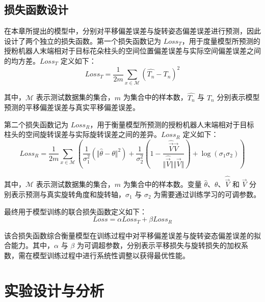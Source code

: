 \subsection{损失函数设计}
在本章所提出的模型中，分别对平移偏差误差与旋转姿态偏差误差进行预测，因此设计了两个独立的损失函数。第一个损失函数记为 $Loss_{T}$，用于度量模型所预测的授粉机器人末端相对于目标花朵柱头的空间位置偏差误差与实际空间偏差误差之间的均方差。$Loss_{T}$ 定义如下：
\begin{equation}
	\label{eq5}
	Loss_{T} = \frac{1}{2m}\sum\limits_{x\in\mathcal{M}}(\hat{T_{n}} - T_{n})^{2} 
\end{equation}

其中，$\mathcal{M}$ 表示测试数据集的集合，$m$ 为集合中的样本数，$\hat{T_{n}}$ 与 $T_{n}$ 分别表示模型预测的平移偏差误差与真实平移偏差误差。

第二个损失函数记为 $Loss_{R}$，用于衡量模型所预测的授粉机器人末端相对于目标柱头的空间旋转误差与实际旋转误差之间的差异。$Loss_{R}$ 定义如下：
\begin{equation}
	\label{eq6}
	Loss_{R} = \frac{1}{2m}\sum\limits_{x\in\mathcal{M}}(\frac{1}{\sigma_{1}^{2}}(\Vert\hat{\theta} -\theta \Vert^{2}) + \frac{1}{\sigma_{2}^{2}}(1 - \frac{\hat{\overrightarrow{V}}\overrightarrow{V}}{\Vert\hat{\overrightarrow{V}}\Vert\Vert\overrightarrow{V}\Vert}) + \log(\sigma_{1}\sigma_{2})) 
\end{equation}

其中，$\mathcal{M}$ 表示测试数据集的集合，$m$ 为集合中的样本数。变量 $\hat{\theta}$、$\theta$、$\hat{\overrightarrow{V}}$ 和 $\overrightarrow{V}$ 分别表示预测与真实旋转角度和旋转轴，$\sigma_{1}$ 与 $\sigma_{2}$ 为需要通过训练学习的可调参数。

最终用于模型训练的联合损失函数定义如下：
\begin{equation}
	\label{eq7}
	Loss =  \alpha Loss_{T} + \beta Loss_{R}
\end{equation}

该合损失函数综合衡量模型在训练过程中对平移偏差误差与旋转姿态偏差误差的拟合能力。其中，$\alpha$ 与 $\beta$ 为可调超参数，分别表示平移损失与旋转损失的加权系数，需在模型训练过程中进行系统性调整以获得最优性能。


\section{实验设计与分析}

